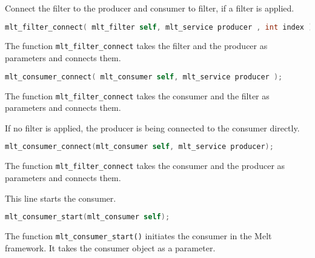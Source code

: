 \documentclass[../MasterThesis.tex]{subfiles}
\begin{document}
\begin{description}[font=\normalfont\color{RedViolet!80!black}, style=nextline]
	Connect the filter to the producer and consumer to filter, if a filter is applied.
	
	\begin{lstlisting}[language=C, numbers=none, basicstyle=\footnotesize\ttfamily, belowskip=0pt, aboveskip=9pt]
	mlt_filter_connect( mlt_filter self, mlt_service producer , int index ); \end{lstlisting}

	The function \texttt{mlt\_filter\_connect} takes the filter and the producer as parameters and connects them.
	
	\begin{lstlisting}[language=C, numbers=none, basicstyle=\footnotesize\ttfamily, belowskip=0pt, aboveskip=9pt]
	mlt_consumer_connect( mlt_consumer self, mlt_service producer ); \end{lstlisting}

	The function \texttt{mlt\_filter\_connect} takes the consumer and the filter as parameters and connects them.
	
	
	If no filter is applied, the producer is being connected to the consumer directly.
	
	\begin{lstlisting}[language=C, numbers=none, basicstyle=\footnotesize\ttfamily, belowskip=0pt, aboveskip=9pt]
	mlt_consumer_connect(mlt_consumer self, mlt_service producer); \end{lstlisting}
	
	The function \texttt{mlt\_filter\_connect} takes the consumer and the producer as parameters and connects them.
	
	
	\item[Start consumer] 
	
	This line starts the consumer.
	
	\begin{lstlisting}[language=C, numbers=none, basicstyle=\footnotesize\ttfamily, belowskip=0pt, aboveskip=9pt]
	mlt_consumer_start(mlt_consumer self);	\end{lstlisting}

	The function \texttt{mlt\_consumer\_start()} initiates the consumer in the Melt framework. It takes the consumer object as a parameter. 
	
	
	
	
	
	\item[Close the components]
	

\end{description}
\end{document}
